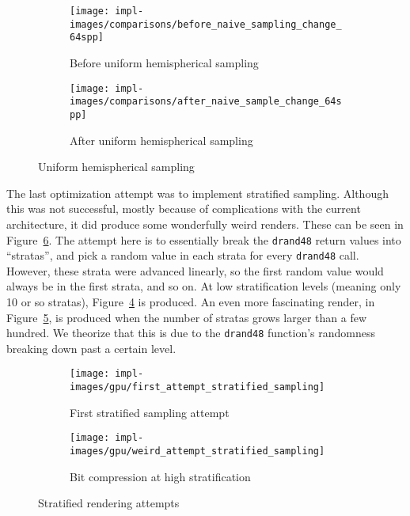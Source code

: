 \vspace{0.3em}
\begin{figure}[htb]
  \centering
  \begin{subfigure}[htb]{0.45\textwidth}
    \texttt{[image: impl-images/comparisons/before\_naive\_sampling\_change\_64spp]}
    \caption{Before uniform hemispherical sampling}
\label{fig:rayterm-gpu_hemispherical_sampling_before}
  \end{subfigure}
  \begin{subfigure}[htb]{0.45\textwidth}
    \texttt{[image: impl-images/comparisons/after\_naive\_sample\_change\_64spp]}
    \caption{After uniform hemispherical sampling}
\label{fig:rayterm-gpu_hemispherical_sampling_after}
  \end{subfigure}
  \caption{Uniform hemispherical sampling}
\label{fig:rayterm-gpu_hemispherical_sampling}
\end{figure}

The last optimization attempt was to implement stratified sampling.
Although this was not successful, mostly because of complications with the current architecture, it did produce some wonderfully weird renders.
These can be seen in Figure~\ref{fig:rayterm-gpu_stratified}.
The attempt here is to essentially break the \texttt{drand48} return values into ``stratas'', and pick a random value in each strata for every \texttt{drand48} call.
However, these strata were advanced linearly, so the first random value would always be in the first strata, and so on.
At low stratification levels (meaning only 10 or so stratas), Figure~\ref{fig:rayterm-gpu_stratified_example} is produced.
An even more fascinating render, in Figure~\ref{fig:rayterm-gpu_bit_compression}, is produced when the number of stratas grows larger than a few hundred.
We theorize that this is due to the \texttt{drand48} function's randomness breaking down past a certain level.

\vspace{0.3em}
\begin{figure}[htb]
  \centering
  \begin{subfigure}[htb]{0.45\textwidth}
    \texttt{[image: impl-images/gpu/first\_attempt\_stratified\_sampling]}
    \caption{First stratified sampling attempt}
\label{fig:rayterm-gpu_stratified_example}
  \end{subfigure}
  \begin{subfigure}[htb]{0.45\textwidth}
    \texttt{[image: impl-images/gpu/weird\_attempt\_stratified\_sampling]}
    \caption{Bit compression at high stratification}
\label{fig:rayterm-gpu_bit_compression}
  \end{subfigure}
  \caption{Stratified rendering attempts}
\label{fig:rayterm-gpu_stratified}
\end{figure}

